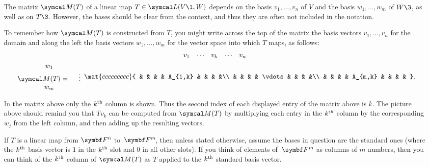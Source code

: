 The matrix $\M(T)$ of a linear map $T \in \L(V\1,W)$ depends on the basis $v_1, \dots, v_n$ of $V$ and the basis $w_1, \dots, w_m$ of $W\3$, as well as on $T\3$. However, the bases should be clear from the context, and thus they are often not included in the notation.

To remember how $\M(T)$ is constructed from $T$, you might
write across the top of the matrix the basis vectors $v_1, \dots, v_n$ for the domain and along the left the basis vectors $w_1, \dots, w_m$ for the vector space into which $T$ maps, as
follows:
\begin{gather*}
v_1 \Space \cdots \Space v_k \Space \cdots  \Space v_n \\
\begin{array}{c}
w_1 \\
\M(T) =\quad\ \vdots \\
w_m
\end{array}
\mat{ccccccccc}{
& &  & & A_{1,k} & & & &\\
& &  & & \vdots & &  & &\\
& &  & & A_{m,k} & &  & & }.
\end{gather*}


In the matrix above only the $k^{\text{{th}}}$ column is shown. Thus
the second index of each displayed entry of the matrix above is $k$. The picture above should remind you that $Tv_k$ can be computed from
$\M(T)$ by  multiplying each entry in the $k^{\text{{th}}}$ column by the
corresponding $w_j$ from  the left column, and then adding up the resulting vectors.


If $T$ is a linear map from $\F{n}$ to~$\FF{m}$, then unless stated otherwise, assume the bases in question are the standard ones (where the $k^{\text{{th}}}$ basis vector is $1$ in the $k^{\text{{th}}}$ slot and $0$ in all other  slots). If you think of elements of~$\F{m}$ as columns of $m$ numbers, then you can think of the $k^{\text{{th}}}$ column of $\M(T)$ as $T$ applied to the $k^{\text{{th}}}$ standard basis vector.

